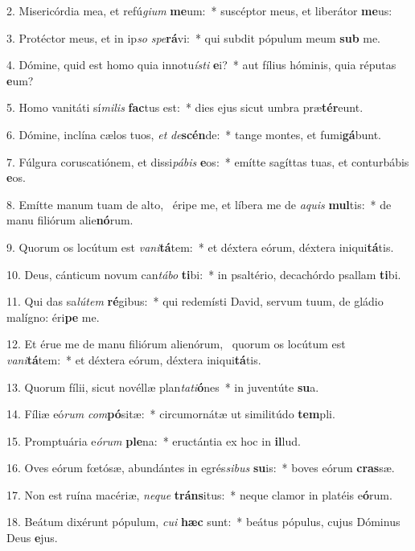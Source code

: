 2. Misericórdia mea, et refú\textit{gi}\textit{um} \textbf{me}um:~*  suscéptor meus, et liberátor \textbf{me}us:\

3. Protéctor meus, et in ip\textit{so} \textit{spe}\textbf{rá}vi:~*  qui subdit pópulum meum \textbf{sub} me.\

4. Dómine, quid est homo quia innotu\textit{ís}\textit{ti} \textbf{e}i?~*  aut fílius hóminis, quia réputas \textbf{e}um?\

5. Homo vanitáti sí\textit{mi}\textit{lis} \textbf{fac}tus est:~*  dies ejus sicut umbra præ\textbf{tér}eunt.\

6. Dómine, inclína cælos tuos, \textit{et} \textit{de}\textbf{scén}de:~*  tange montes, et fumi\textbf{gá}bunt.\

7. Fúlgura coruscatiónem, et dissi\textit{pá}\textit{bis} \textbf{e}os:~*  emítte sagíttas tuas, et conturbábis \textbf{e}os.\

8. Emítte manum tuam de alto, \dag\  éripe me, et líbera me de \textit{a}\textit{quis} \textbf{mul}tis:~*  de manu filiórum alie\textbf{nó}rum.\

9. Quorum os locútum est \textit{va}\textit{ni}\textbf{tá}tem:~*  et déxtera eórum, déxtera iniqui\textbf{tá}tis.\

10. Deus, cánticum novum can\textit{tá}\textit{bo} \textbf{ti}bi:~*  in psaltério, decachórdo psallam \textbf{ti}bi.\

11. Qui das sa\textit{lú}\textit{tem} \textbf{ré}gibus:~*  qui redemísti David, servum tuum, de gládio malígno: éri\textbf{pe} me.\

12. Et érue me de manu filiórum alienórum, \dag\  quorum os locútum est \textit{va}\textit{ni}\textbf{tá}tem:~*  et déxtera eórum, déxtera iniqui\textbf{tá}tis.\

13. Quorum fílii, sicut novéllæ plan\textit{ta}\textit{ti}\textbf{ó}nes~*  in juventúte \textbf{su}a.\

14. Fíliæ eó\textit{rum} \textit{com}\textbf{pó}sitæ:~*  circumornátæ ut similitúdo \textbf{tem}pli.\

15. Promptuária e\textit{ó}\textit{rum} \textbf{ple}na:~*  eructántia ex hoc in \textbf{il}lud.\

16. Oves eórum fœtósæ, abundántes in egrés\textit{si}\textit{bus} \textbf{su}is:~*  boves eórum \textbf{cras}sæ.\

17. Non est ruína macériæ, \textit{ne}\textit{que} \textbf{tráns}itus:~*  neque clamor in platéis e\textbf{ó}rum.\

18. Beátum dixérunt pópulum, \textit{cu}\textit{i} \textbf{hæc} sunt:~*  beátus pópulus, cujus Dóminus Deus \textbf{e}jus.\

